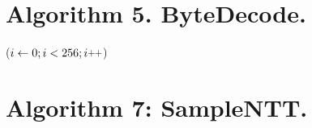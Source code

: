 \documentclass[12pt]{article}
\begin{document}
\section{Algorithm 5. ByteDecode.}

\begin{algorithm}[H]
\caption*{\textbf{Annotated Algorithm 6} $\Name{ByteDecode}_d(B:\mathbb{B}^{32}) \rightarrow F:\RingZm $}
\begin{algorithmic}[1]
\vspace*{1pt}
\vspace*{1pt}


\For ($ i \is 0; i < 256; i\plusplus $)
\EndFor

\end{algorithmic}
\end{algorithm}

\section{Algorithm 7: SampleNTT.}
\newcommand{\AH}{\ensuremath{\widehat{a}\;\!}}
\newcommand{\Ctx}{\mathrm{ctx}}
\newcommand{\XOFInit}{\mathrm{XOF.Init}}
\newcommand{\XOFAbsorb}[2]{\mathrm{XOF.Absorb}(#1, #2)}
\newcommand{\XOFSqueeze}[2]{\mathrm{XOF.Squeeze}(#1, #2)}
\end{document}
